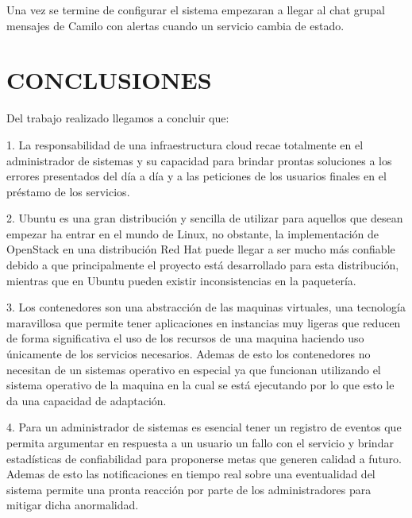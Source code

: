      
     
     Una vez se termine de configurar el sistema empezaran a llegar al chat grupal mensajes de Camilo con alertas cuando un servicio cambia de estado.
    
    
    
   
   
   
   
   
   
   
    
    \newpage\chapter{CONCLUSIONES}
    
    Del trabajo realizado llegamos a concluir que:
    
    1. La responsabilidad de una infraestructura cloud recae totalmente en el administrador de sistemas y su capacidad para brindar prontas soluciones a los errores presentados del día a día y a las peticiones de los usuarios finales en el préstamo de los servicios. 
    
    2. Ubuntu es una gran distribución y sencilla de utilizar para aquellos que desean empezar ha entrar en el mundo de Linux, no obstante, la implementación de OpenStack en una distribución Red Hat puede llegar a ser mucho más confiable debido a que principalmente el proyecto está desarrollado para esta distribución, mientras que en Ubuntu pueden existir inconsistencias en la paquetería.
    
    3. Los contenedores son una abstracción de las maquinas virtuales, una tecnología maravillosa que permite tener aplicaciones en instancias muy  ligeras que reducen de forma significativa el uso de los recursos de una maquina haciendo uso únicamente de los servicios necesarios. Ademas de esto los contenedores no necesitan de un sistemas operativo en especial ya que funcionan utilizando el sistema operativo de la maquina en la cual se está ejecutando por lo que esto le da una capacidad de adaptación.  
    
    4. Para un administrador de sistemas es esencial tener un registro de eventos que permita argumentar en respuesta a un usuario un fallo con el servicio y brindar estadísticas de confiabilidad para proponerse metas que generen calidad a futuro. Ademas de esto las notificaciones en tiempo real sobre una eventualidad del sistema permite una pronta reacción por parte de los administradores para mitigar dicha anormalidad.
    
